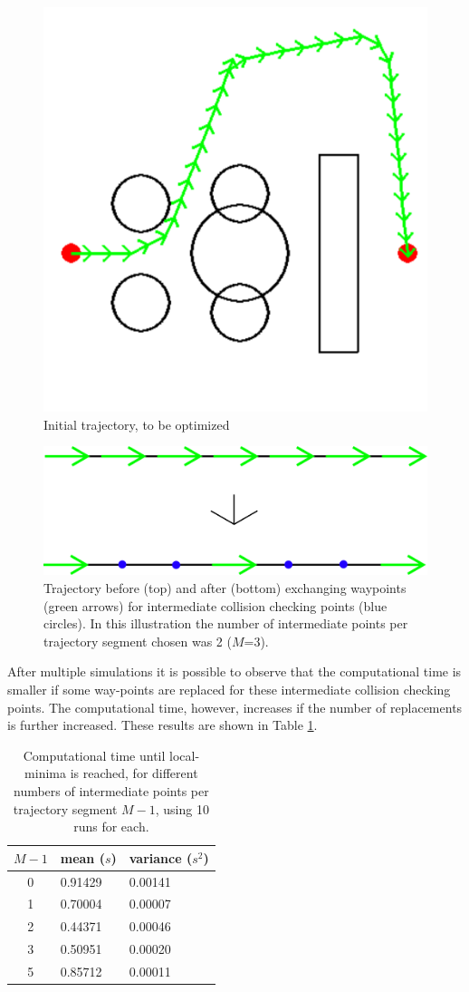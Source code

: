 \begin{figure}[H]
    \centering
    \includegraphics[width=0.6\linewidth]{Figures/05_optimization/initialIter.png}
    \caption{Initial trajectory, to be optimized}
    \label{fig:x0}
\end{figure} 

\begin{figure}[H]
    \centering
    \includegraphics[width=0.8\linewidth]{Figures/05_optimization/cleanInter.png}
    \caption{Trajectory before (top) and after (bottom) exchanging waypoints (green arrows) for intermediate collision checking points (blue  circles). In this illustration the number of intermediate points per trajectory segment chosen was 2 ($M$=3).}
    \label{fig:interClean}
\end{figure}

\par
After multiple simulations it is possible to observe that the computational time is smaller if some way-points are replaced for these intermediate collision checking points. The computational time, however, increases if the number of replacements is further increased. These results are shown in Table \ref{IPOPTresultsInter2}.

\begin{table}[H]
    \centering
    \begin{tabular}{c|l|l}
        $M-1$ & mean ($s$) & variance ($s^2$) \\ \hline
        0 & 0.91429 & 0.00141 \\
        1 & 0.70004 & 0.00007 \\
        2 & 0.44371 & 0.00046 \\
        3 & 0.50951 & 0.00020 \\
        5 & 0.85712 & 0.00011 \\ \hline
    \end{tabular}
    \caption{Computational time until local-minima is reached, for different numbers of intermediate points per trajectory segment $M-1$, using 10 runs for each. }
    \label{IPOPTresultsInter2}
\end{table}


